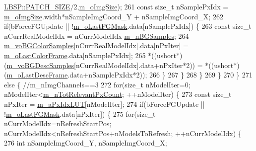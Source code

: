 \begin{DoxyCode}
      \mbox{\hyperlink{class_l_b_s_p_aa98abb79a155d3a2b416c2ab32e74929}{LBSP::PATCH\_SIZE}}/2,\mbox{\hyperlink{class_background_subtractor_l_b_s_p_a732d5e6ae35fb0e858cadb3af5ce08a2}{m\_oImgSize}});
261                     \textcolor{keyword}{const} \textcolor{keywordtype}{size\_t} nSamplePxIdx = \mbox{\hyperlink{class_background_subtractor_l_b_s_p_a732d5e6ae35fb0e858cadb3af5ce08a2}{m\_oImgSize}}.width*nSampleImgCoord\_Y + 
      nSampleImgCoord\_X;
262                     \textcolor{keywordflow}{if}(bForceFGUpdate || !\mbox{\hyperlink{class_background_subtractor_l_b_s_p_adb6dc0af596c5592c91f9d8faa5c8a4b}{m\_oLastFGMask}}.data[nSamplePxIdx]) \{
263                         \textcolor{keyword}{const} \textcolor{keywordtype}{size\_t} nCurrRealModelIdx = nCurrModelIdx%
      \mbox{\hyperlink{class_background_subtractor_su_b_s_e_n_s_e_ad783b71b5b942c4018d27cf38b7d7225}{m\_nBGSamples}};
264                         \mbox{\hyperlink{class_background_subtractor_su_b_s_e_n_s_e_a9d4d4bb930b34745536b9862683bb539}{m\_voBGColorSamples}}[nCurrRealModelIdx].data[nPxIter] = 
      \mbox{\hyperlink{class_background_subtractor_l_b_s_p_ab1dc003792ab1d0b881a6fd10e0e29b3}{m\_oLastColorFrame}}.data[nSamplePxIdx];
265                         *((ushort*)(\mbox{\hyperlink{class_background_subtractor_su_b_s_e_n_s_e_a422cc2f2a25c07efca02087bd6fe3d6d}{m\_voBGDescSamples}}[nCurrRealModelIdx].data+nPxIter*2)) 
      = *((ushort*)(\mbox{\hyperlink{class_background_subtractor_l_b_s_p_a9c637c0b87cac495887295690d83ba13}{m\_oLastDescFrame}}.data+nSamplePxIdx*2));
266                     \}
267                 \}
268             \}
269         \}
270     \}
271     \textcolor{keywordflow}{else} \{ \textcolor{comment}{//m\_nImgChannels==3}
272         \textcolor{keywordflow}{for}(\textcolor{keywordtype}{size\_t} nModelIter=0; nModelIter<\mbox{\hyperlink{class_background_subtractor_l_b_s_p_ac3b54f4d2dfa3a576475214f26501d85}{m\_nTotRelevantPxCount}}; ++nModelIter) \{
273             \textcolor{keyword}{const} \textcolor{keywordtype}{size\_t} nPxIter = \mbox{\hyperlink{class_background_subtractor_l_b_s_p_a06b4f0d3f24fa08bccd3c9eca085713e}{m\_aPxIdxLUT}}[nModelIter];
274             \textcolor{keywordflow}{if}(bForceFGUpdate || !\mbox{\hyperlink{class_background_subtractor_l_b_s_p_adb6dc0af596c5592c91f9d8faa5c8a4b}{m\_oLastFGMask}}.data[nPxIter]) \{
275                 \textcolor{keywordflow}{for}(\textcolor{keywordtype}{size\_t} nCurrModelIdx=nRefreshStartPos; nCurrModelIdx<nRefreshStartPos+nModelsToRefresh;
       ++nCurrModelIdx) \{
276                     \textcolor{keywordtype}{int} nSampleImgCoord\_Y, nSampleImgCoord\_X;

\end{DoxyCode}
